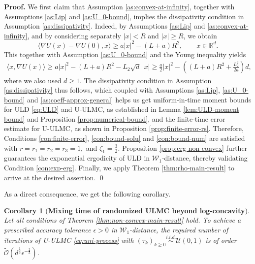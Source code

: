 \documentclass[12pt]{article}
\newenvironment{bluetext}
  {\color{black}\ignorespaces}
  {\ignorespacesafterend}
\numberwithin{equation}{section}
\renewenvironment{proof}%
  {\begin{trivlist}%
   \item[]\ignorespaces}%
  {\qed\end{trivlist}}
\newtheorem{cor}{Corollary}[section]
\begin{document}
\begin{proof}
\textbf{Proof.} 
\begin{bluetext}
We first claim that Assumption \ref{as:convex-at-infinity}, together with Assumptions \ref{as:Lip} and \ref{as:U_0-bound}, implies the dissipativity condition in Assumption \ref{as:dissipativity}.
%
Indeed, by Assumptions \ref{as:Lip} and \ref{as:convex-at-infinity}, and by
considering separately $|x|<R$ and $|x|\geq R$, we obtain
\[
\langle \nabla U(x)-\nabla U(0),x\rangle
\geq a|x|^2-(L+a)R^2,
\qquad x\in\mathbb R^d.
\]
This together with Assumption \ref{as:U_0-bound} and the Young inequality yields
\begin{align*}
\langle x,\nabla U(x)\rangle
\geq a|x|^2-(L+a)R^2-L_2\sqrt d\,|x| \geq \tfrac a2|x|^2
-\left((L+a)R^2+\tfrac{L_2^2}{2a}\right)d,
\end{align*}
where we also used $d\geq1$.
\end{bluetext}
The dissipativity condition in Assumption \ref{as:dissipativity} thus follows, 
which coupled with Assumptions \ref{as:Lip}, \ref{as:U_0-bound} and \ref{as:coeff-approx-general} helps us get uniform-in-time moment bounds for ULD \eqref{eq:ULD} and U-ULMC, as established in Lemma \ref{lem:ULD-moment bound} and Proposition \ref{prop:numerical-bound}, and the finite-time error estimate for U-ULMC, as shown in Proposition \ref{prop:finite-error-rs}. Therefore, Conditions \ref{con:finite-error}, \ref{con:bound-solu} and \ref{con:bound-num} are satisfied with
$
r=r_1=r_2=r_3=1,
$ 
and
$
\zeta_1=\frac32
$. 
Proposition \ref{prop:erg-non-convex} further guarantees the exponential ergodicity of ULD in \(\mathcal{W}_1\)-distance, thereby validating Condition \ref{con:exp-erg}. Finally, we apply Theorem \ref{thm:rho-main-result} to arrive at the desired assertion.
\end{proof}

As a direct consequence, we get the following corollary.

\begin{cor}[\textbf{Mixing time of randomized ULMC beyond log-concavity}] \label{prop:mixing_time-non-convex}
    Let all conditions of Theorem \ref{thm:non-convex-main-result} hold. 
    To achieve a prescribed accuracy tolerance \(\epsilon>0\) in \(\mathcal W_1\)-distance, the required number of iterations of U-ULMC \eqref{eq:uni-process} with $(\tau_k)_{k\ge 0} \overset{i.i.d.}{\sim} \mathcal{U}(0,1)$ is of order $\widetilde{\mathcal{O}}(d^{\frac{1}{3}}\epsilon^{-\frac{2}{3}})$.
\end{cor}
\end{document}
